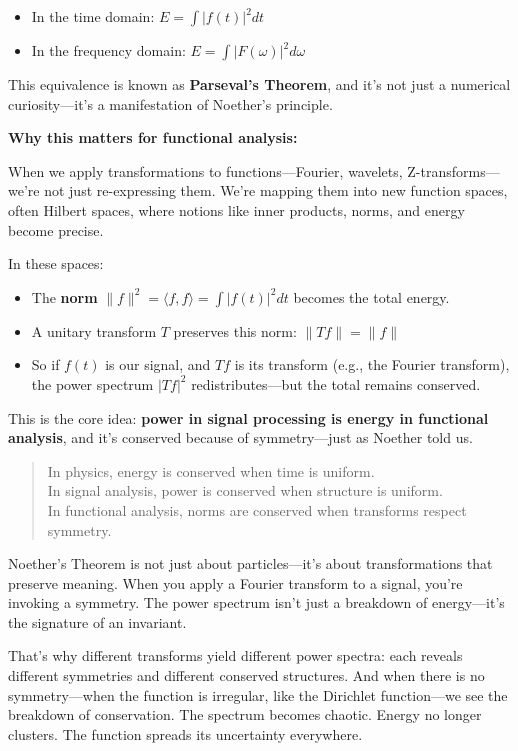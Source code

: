 \begin{itemize}
    \item In the time domain: \( E = \int |f(t)|^2 dt \)
    \item In the frequency domain: \( E = \int |F(\omega)|^2 d\omega \)
\end{itemize}

This equivalence is known as \textbf{Parseval’s Theorem}, and it’s not just a numerical curiosity—it’s a manifestation of Noether’s principle.

\vspace{1em}
\noindent
\textbf{Why this matters for functional analysis:}

When we apply transformations to functions—Fourier, wavelets, Z-transforms—we're not just re-expressing them. We're mapping them into new function spaces, often Hilbert spaces, where notions like inner products, norms, and energy become precise.

In these spaces:
\begin{itemize}
    \item The \textbf{norm} \( \|f\|^2 = \langle f, f \rangle = \int |f(t)|^2 dt \) becomes the total energy.
    \item A unitary transform \( T \) preserves this norm: \( \|Tf\| = \|f\| \)
    \item So if \( f(t) \) is our signal, and \( Tf \) is its transform (e.g., the Fourier transform), the power spectrum \( |Tf|^2 \) redistributes—but the total remains conserved.
\end{itemize}

This is the core idea: \textbf{power in signal processing is energy in functional analysis}, and it’s conserved because of symmetry—just as Noether told us.

\begin{quote}
In physics, energy is conserved when time is uniform.\\
In signal analysis, power is conserved when structure is uniform.\\
In functional analysis, norms are conserved when transforms respect symmetry.
\end{quote}

Noether’s Theorem is not just about particles—it’s about transformations that preserve meaning. When you apply a Fourier transform to a signal, you’re invoking a symmetry. The power spectrum isn’t just a breakdown of energy—it’s the signature of an invariant.

That’s why different transforms yield different power spectra: each reveals different symmetries and different conserved structures. And when there is no symmetry—when the function is irregular, like the Dirichlet function—we see the breakdown of conservation. The spectrum becomes chaotic. Energy no longer clusters. The function spreads its uncertainty everywhere.

